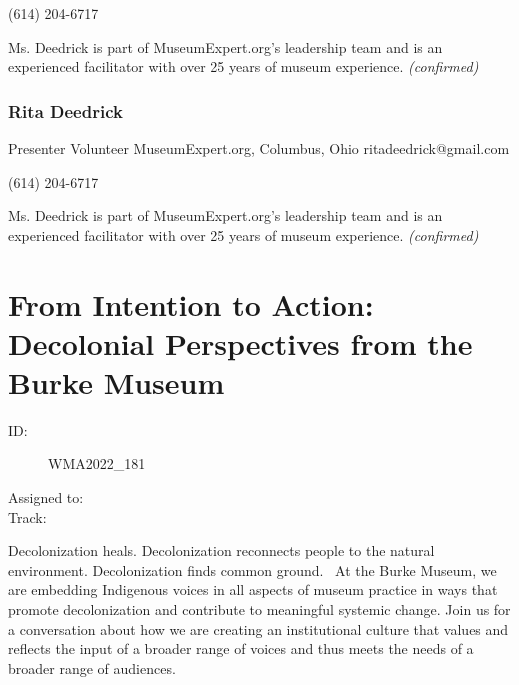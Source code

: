 \documentclass{report}
\begin{document}
                (614) 204-6717\newline

                Ms. Deedrick is part of MuseumExpert.org’s leadership team and is an experienced facilitator with over 25 years of museum experience.\newline
                \emph{ (confirmed) }
              

              
                \subsubsection*{ Rita Deedrick }
                Presenter\newline
                Volunteer\newline
                MuseumExpert.org, Columbus, Ohio
                \newline
                ritadeedrick@gmail.com\newline
                
                (614) 204-6717\newline

                Ms. Deedrick is part of MuseumExpert.org’s leadership team and is an experienced facilitator with over 25 years of museum experience.
                \emph{ (confirmed) }
              

              

              

              
        
          \newpage
          \section{ From Intention to Action: Decolonial Perspectives from the Burke Museum }
            \begin{description}
              \item [ID:]
              WMA2022\_181

              \item [Assigned to:]
                \item [Track:]
              \end{description}

              Decolonization heals. Decolonization reconnects people to the natural environment. Decolonization finds common ground. 
At the Burke Museum, we are embedding Indigenous voices in all aspects of museum practice in ways that promote decolonization and contribute to meaningful systemic change.
Join us for a conversation about how we are creating an institutional culture that values and reflects the input of a broader range of voices and thus meets the needs of a broader range of audiences.
\end{document}
